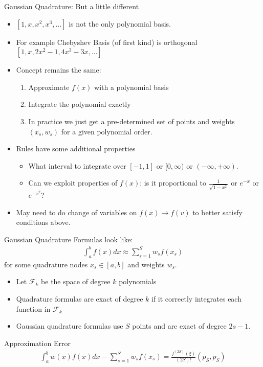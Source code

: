 \begin{frame}{Gaussian Quadrature: But a little different}

\begin{itemize}
\item $[1,x,x^2,x^3,\ldots]$ is not the only \alert{polynomial basis}.
\item For example \alert{Chebyshev Basis} (of first kind) is \alert{orthogonal} $[1,x,2x^2-1,4x^3-3x,\ldots]$
\item Concept remains the same:
\begin{enumerate}
\item Approximate $f(x)$ with a polynomial basis
\item Integrate the polynomial exactly
\item In practice we just get a pre-determined set of points and weights $(x_s,w_s)$ for a given polynomial order.
\end{enumerate}
\item Rules have some additional properties
\begin{itemize}
\item What interval to integrate over $[-1,1]$ or $[0,\infty)$ or $(-\infty,+\infty)$.
\item Can we exploit properties of $f(x)$: is it proportional to $\frac{1}{\sqrt{1-x^2}}$ or $e^{-x}$ or $e^{-x^2}$?
\end{itemize}
\item May need to do change of variables on $f(x) \rightarrow f(v)$ to better satisfy conditions above.
\end{itemize}
\end{frame}


\begin{frame}{Gaussian Quadrature}
\small
Formulas look like:
\begin{eqnarray*}
\int_{a}^b f(x) d x \approx \sum_{s=1}^S  w_s f(x_s)
\end{eqnarray*}
for some quadrature nodes $x_s \in [a,b]$ and weights $w_s$.
\begin{itemize}
\item Let $\mathcal{F}_k$ be the space of degree $k$ polynomials
\item Quadrature formulas are exact of degree $k$ if it correctly integrates each function in $\mathcal{F}_k$
\item Gaussian quadrature formulas use $S$ points and are exact of degree $2s-1$.
\end{itemize}
Approximation Error
\begin{eqnarray*}
\int_a^b w(x) f(x)  dx - \sum_{s=1}^S w_s f(x_s) = \frac{f^{(2S)}(\xi)}{(2S)!} (p_S,p_S) 
\end{eqnarray*}
\end{frame}


